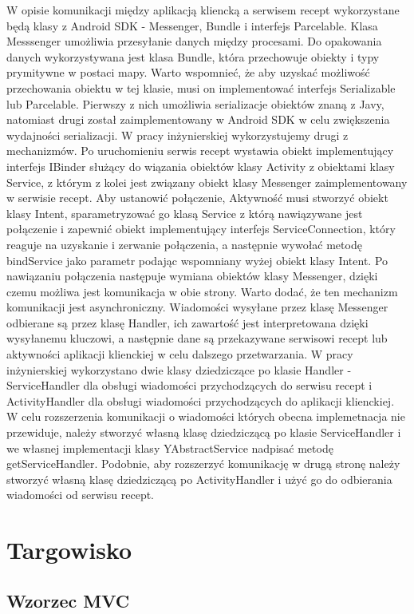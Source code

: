 \documentclass[11pt,a4paper,polish,thesis]{dcsbook}
\begin{document}
W opisie komunikacji między aplikacją kliencką a serwisem recept wykorzystane będą klasy z Android SDK - Messenger, Bundle i interfejs Parcelable. Klasa Messsenger umożliwia przesyłanie danych między procesami. \cite{android.mesage} Do opakowania danych wykorzystywana jest klasa Bundle, która przechowuje obiekty i typy prymitywne w postaci mapy. Warto wspomnieć, że aby uzyskać możliwość przechowania obiektu w tej klasie, musi on implementować interfejs Serializable lub Parcelable. Pierwszy z nich umożliwia serializacje obiektów znaną z Javy, natomiast drugi został zaimplementowany w Android SDK w celu zwiększenia wydajności serializacji. W pracy inżynierskiej wykorzystujemy drugi z mechanizmów. Po uruchomieniu serwis recept wystawia obiekt implementujący interfejs IBinder służący do wiązania obiektów klasy Activity z obiektami klasy Service,  z którym z kolei jest związany obiekt klasy Messenger zaimplementowany w serwisie recept. Aby ustanowić połączenie, Aktywność musi stworzyć obiekt klasy Intent, sparametryzować go klasą Service z którą nawiązywane jest połączenie i zapewnić obiekt implementujący interfejs ServiceConnection, który reaguje na uzyskanie i zerwanie połączenia, a następnie wywołać metodę bindService jako parametr podając wspomniany wyżej obiekt klasy Intent. Po nawiązaniu połączenia następuje wymiana obiektów klasy Messenger, dzięki czemu możliwa jest komunikacja w obie strony. Warto dodać, że ten mechanizm komunikacji jest asynchroniczny. Wiadomości wysyłane przez klasę Messenger odbierane są przez klasę Handler, ich zawartość jest interpretowana dzięki wysyłanemu kluczowi, a następnie dane są przekazywane serwisowi recept lub aktywności aplikacji klienckiej w celu dalszego przetwarzania. W pracy inżynierskiej wykorzystano dwie klasy dziedziczące po klasie Handler - ServiceHandler dla obsługi wiadomości przychodzących do serwisu recept i ActivityHandler dla obsługi wiadomości przychodzących do aplikacji klienckiej. W celu rozszerzenia komunikacji o wiadomości których obecna implemetnacja nie przewiduje, należy stworzyć własną klasę dziedziczącą po klasie ServiceHandler i we własnej implementacji klasy YAbstractService nadpisać metodę getServiceHandler. Podobnie, aby rozszerzyć komunikację w drugą stronę należy stworzyć własną klasę dziedziczącą po ActivityHandler i użyć go do odbierania wiadomości od serwisu recept.
\section{Targowisko}
\subsection{Wzorzec MVC}
\end{document}
